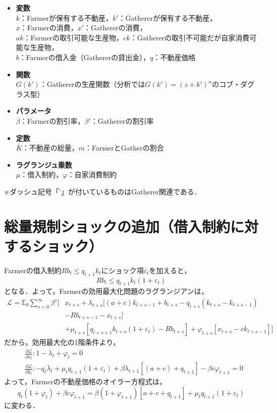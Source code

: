 \documentclass[dvipdfmx]{jlreq}
\begin{document}
\begin{itemize}
  \item \textbf{変数} \\
    $k$：Farmerが保有する不動産，$k'$：Gathererが保有する不動産， \\
    $x$：Farmerの消費，$x'$：Gathererの消費， \\
    $ak$：Farmerの取引可能な生産物，$ck$：Gathererの取引不可能だが自家消費可能な生産物， \\
    $b$：Farmerの借入金（Gathererの貸出金），$q$：不動産価格
  \item \textbf{関数} \\
    $G(k')$：Gathererの生産関数（分析では$G(k')=(z+k')^\alpha$のコブ・ダグラス型）
  \item \textbf{パラメータ} \\
    $\beta$：Farmerの割引率，$\beta'$：Gathererの割引率
  \item \textbf{定数} \\
    $\bar{K}$：不動産の総量，$m$：FarmerとGatherの割合
  \item \textbf{ラグランジュ乗数} \\
    $\mu$：借入制約，$\varphi$：自家消費制約
\end{itemize}
※ダッシュ記号「'」が付いているものはGatherer関連である．

\newpage

\section{総量規制ショックの追加（借入制約に対するショック）}
Farmerの借入制約$R b_t \leq q_{t+1} k_t$にショック項$\varepsilon_t$を加えると，
\begin{equation}
  R b_t \leq q_{t+1} k_t (1+\varepsilon_t)
\end{equation}
となる．よって，Farmerの効用最大化問題のラグランジアンは，
\begin{equation}
  \begin{aligned}
    \mathcal{L} = \mathbb{E}_0 \sum_{s=0}^{\infty} \beta^s \bigg[ & x_{t+s} + \lambda_{t+s} [(a + c) k_{t+s-1} + b_{t+s} - q_{t+s} (k_{t+s} - k_{t+s-1}) \\
    &- R b_{t+s-1} - x_{t+s}] \\
    &+\mu_{t+s}[q_{t+s+1}k_{t+s}(1+\varepsilon_t) - R b_{t+s}] + \varphi_{t+s}[x_{t+s} - ck_{t+s-1}] \bigg]
  \end{aligned}
\end{equation}
だから，効用最大化の1階条件より，
\begin{align}
  &\frac{\partial\mathcal{L}}{\partial x_t}: 1 - \lambda_t + \varphi_t = 0 \\
  &\frac{\partial\mathcal{L}}{\partial k_t}: - q_t \lambda_t + \mu_t q_{t+1}(1+\varepsilon_t) + \beta \lambda_{t+1}[(a+c) + q_{t+1}] - \beta c \varphi_{t+1} = 0
\end{align}
よって，Farmerの不動産価格のオイラー方程式は，
\begin{equation}
  q_t (1 + \varphi_t) + \beta c \varphi_{t+1} = \beta (1 + \varphi_{t+1})[a + c + q_{t+1}] + \mu_t q_{t+1} (1+\varepsilon_t)
\end{equation}
に変わる．
\end{document}
